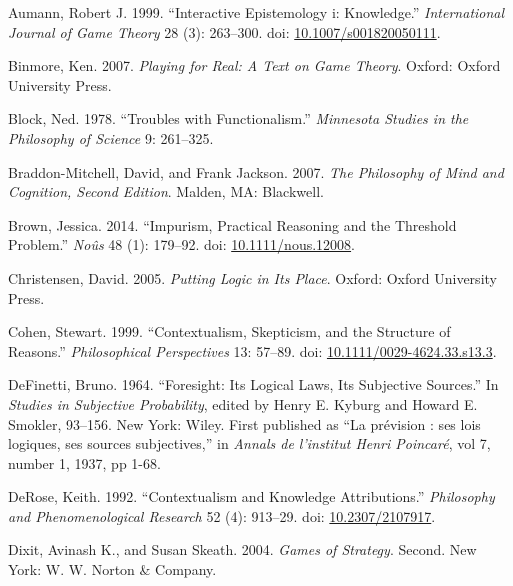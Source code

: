 \documentclass[
  10pt,
  letterpaper,
  DIV=11,
  numbers=noendperiod,
  twoside]{scrartcl}
\newlength{\cslhangindent}
\newenvironment{CSLReferences}[2] %
 {\begin{list}{}{%
  \setlength{\itemindent}{0pt}
  \setlength{\leftmargin}{0pt}
  \setlength{\parsep}{0pt}
  \ifodd #1
   \setlength{\leftmargin}{\cslhangindent}
   \setlength{\itemindent}{-1\cslhangindent}
  \fi
  \setlength{\itemsep}{#2\baselineskip}}}
 {\end{list}}
\begin{document}
\label{refs}
\begin{CSLReferences}{1}{0}
Aumann, Robert J. 1999. {``Interactive Epistemology i: Knowledge.''}
\emph{International Journal of Game Theory} 28 (3): 263--300. doi:
\href{https://doi.org/10.1007/s001820050111}{10.1007/s001820050111}.

Binmore, Ken. 2007. \emph{Playing for Real: A Text on Game Theory}.
Oxford: Oxford University Press.

Block, Ned. 1978. {``Troubles with Functionalism.''} \emph{Minnesota
Studies in the Philosophy of Science} 9: 261--325.

Braddon-Mitchell, David, and Frank Jackson. 2007. \emph{The Philosophy
of Mind and Cognition, {Second Edition}}. Malden, MA: Blackwell.

Brown, Jessica. 2014. {``Impurism, Practical Reasoning and the Threshold
Problem.''} \emph{No{û}s} 48 (1): 179--92. doi:
\href{https://doi.org/10.1111/nous.12008}{10.1111/nous.12008}.

Christensen, David. 2005. \emph{Putting Logic in Its Place}. Oxford:
Oxford University Press.

Cohen, Stewart. 1999. {``Contextualism, Skepticism, and the Structure of
Reasons.''} \emph{Philosophical Perspectives} 13: 57--89. doi:
\href{https://doi.org/10.1111/0029-4624.33.s13.3}{10.1111/0029-4624.33.s13.3}.

DeFinetti, Bruno. 1964. {``Foresight: Its Logical Laws, Its Subjective
Sources.''} In \emph{Studies in Subjective Probability}, edited by Henry
E. Kyburg and Howard E. Smokler, 93--156. New York: Wiley. First
published as {``La pr{é}vision : ses lois logiques, ses sources
subjectives,''} in \emph{Annals de l'institut Henri Poincar{é}}, vol 7,
number 1, 1937, pp 1-68.

DeRose, Keith. 1992. {``Contextualism and Knowledge Attributions.''}
\emph{Philosophy and Phenomenological Research} 52 (4): 913--29. doi:
\href{https://doi.org/10.2307/2107917}{10.2307/2107917}.

Dixit, Avinash K., and Susan Skeath. 2004. \emph{Games of Strategy}.
Second. New York: W. W. Norton \& Company.


\end{CSLReferences}
\end{document}
